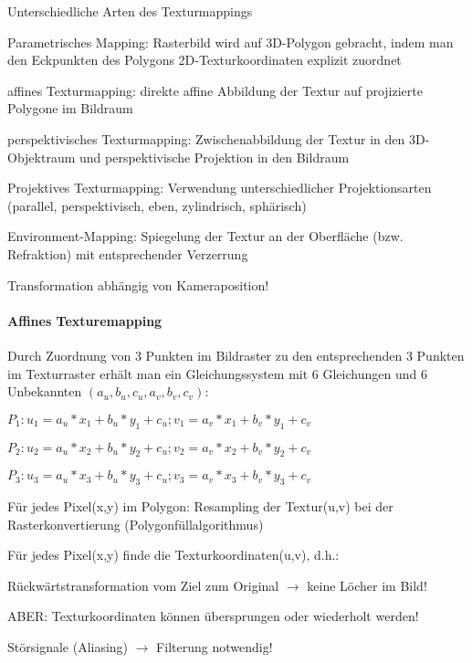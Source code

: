 \documentclass[landscape]{article}
\begin{document}
\begin{multicols}{3}
  Unterschiedliche Arten des Texturmappings
  \begin{itemize*}
    \item Parametrisches Mapping: Rasterbild wird auf 3D-Polygon gebracht, indem man den Eckpunkten des Polygons 2D-Texturkoordinaten explizit zuordnet
    \item affines Texturmapping: direkte affine Abbildung der Textur auf projizierte Polygone im Bildraum
    \item perspektivisches Texturmapping: Zwischenabbildung der Textur in den 3D-Objektraum und perspektivische Projektion in den Bildraum
    \item Projektives Texturmapping: Verwendung unterschiedlicher Projektionsarten (parallel, perspektivisch, eben, zylindrisch, sphärisch)
    \item Environment-Mapping: Spiegelung der Textur an der Oberfläche (bzw. Refraktion) mit entsprechender Verzerrung
    \item Transformation abhängig von Kameraposition!
  \end{itemize*}
  
  \paragraph{Affines Texturemapping}
  Durch Zuordnung von 3 Punkten im Bildraster zu den entsprechenden 3 Punkten im Texturraster erhält man ein Gleichungssystem mit 6 Gleichungen und 6 Unbekannten $(a_u , b_u , c_u , a_v , b_v , c_v )$:
  \begin{itemize*}
    \item $P_1: u_1=a_u*x_1+b_u*y_1+c_u; v_1=a_v*x_1+b_v*y_1+c_v$
    \item $P_2: u_2=a_u*x_2+b_u*y_2+c_u; v_2=a_v*x_2+b_v*y_2+c_v$
    \item $P_3: u_3=a_u*x_3+b_u*y_3+c_u; v_3=a_v*x_3+b_v*y_3+c_v$
  \end{itemize*}
  
  Für jedes Pixel(x,y) im Polygon: Resampling der Textur(u,v) bei der Rasterkonvertierung (Polygonfüllalgorithmus)
  
  Für jedes Pixel(x,y) finde die Texturkoordinaten(u,v), d.h.:
  \begin{itemize*}
    \item Rückwärtstransformation vom Ziel zum Original $\rightarrow$ keine Löcher im Bild!
    \item ABER: Texturkoordinaten können übersprungen oder wiederholt werden!
    \item Störsignale (Aliasing) $\rightarrow$ Filterung notwendig!
  \end{itemize*}
  

\end{multicols}
\end{document}
